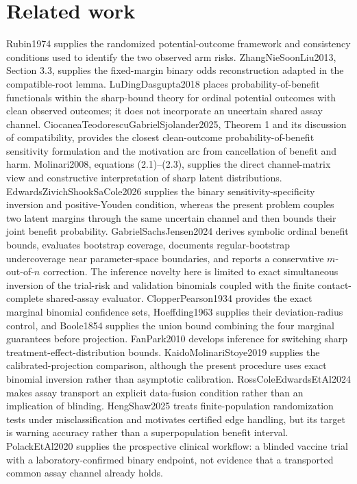 \documentclass{article}
\begin{document}
\section{Related work}

Rubin1974 supplies the randomized potential-outcome framework and consistency conditions used to identify the two observed arm risks. ZhangNieSoonLiu2013, Section 3.3, supplies the fixed-margin binary odds reconstruction adapted in the compatible-root lemma. LuDingDasgupta2018 places probability-of-benefit functionals within the sharp-bound theory for ordinal potential outcomes with clean observed outcomes; it does not incorporate an uncertain shared assay channel. CiocaneaTeodorescuGabrielSjolander2025, Theorem 1 and its discussion of compatibility, provides the closest clean-outcome probability-of-benefit sensitivity formulation and the motivation arc from cancellation of benefit and harm. Molinari2008, equations (2.1)--(2.3), supplies the direct channel-matrix view and constructive interpretation of sharp latent distributions. EdwardsZivichShookSaCole2026 supplies the binary sensitivity-specificity inversion and positive-Youden condition, whereas the present problem couples two latent margins through the same uncertain channel and then bounds their joint benefit probability. GabrielSachsJensen2024 derives symbolic ordinal benefit bounds, evaluates bootstrap coverage, documents regular-bootstrap undercoverage near parameter-space boundaries, and reports a conservative \(m\)-out-of-\(n\) correction. The inference novelty here is limited to exact simultaneous inversion of the trial-risk and validation binomials coupled with the finite contact-complete shared-assay evaluator. ClopperPearson1934 provides the exact marginal binomial confidence sets, Hoeffding1963 supplies their deviation-radius control, and Boole1854 supplies the union bound combining the four marginal guarantees before projection. FanPark2010 develops inference for switching sharp treatment-effect-distribution bounds. KaidoMolinariStoye2019 supplies the calibrated-projection comparison, although the present procedure uses exact binomial inversion rather than asymptotic calibration. RossColeEdwardsEtAl2024 makes assay transport an explicit data-fusion condition rather than an implication of blinding. HengShaw2025 treats finite-population randomization tests under misclassification and motivates certified edge handling, but its target is warning accuracy rather than a superpopulation benefit interval. PolackEtAl2020 supplies the prospective clinical workflow: a blinded vaccine trial with a laboratory-confirmed binary endpoint, not evidence that a transported common assay channel already holds.
\end{document}
